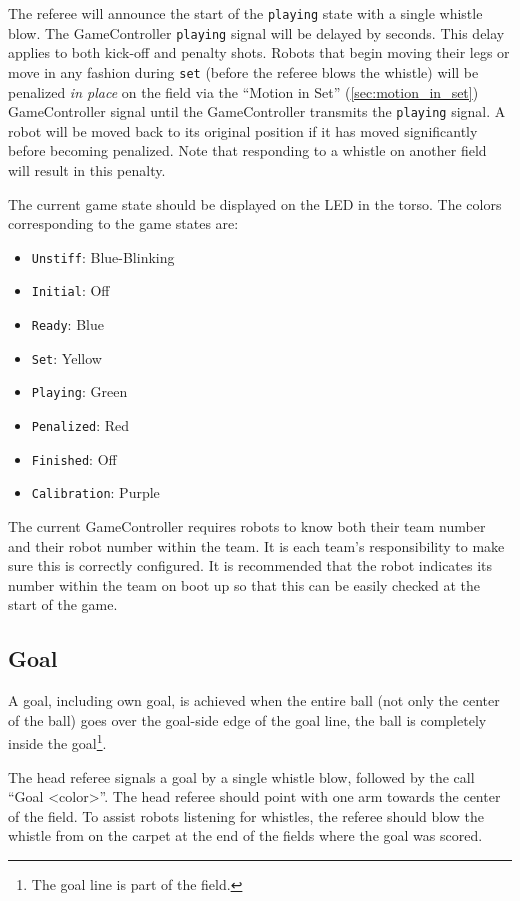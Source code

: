 The referee will announce the start of the \texttt{playing} state with a single whistle blow.
The GameController \texttt{playing} signal will be delayed by \PlayingDelayTime seconds.
This delay applies to both kick-off and penalty shots.
Robots that begin moving their legs or move in any fashion during \texttt{set} (\ie before the referee blows the whistle) will be penalized \textit{in place} on the field via the ``Motion in Set'' (\cf \cref{sec:motion_in_set}) GameController signal until the GameController transmits the \texttt{playing} signal. A robot will be moved back to its original position if it has moved significantly before becoming penalized.
Note that responding to a whistle on another field will result in this penalty.

The current game state should be displayed on the LED in the torso. The colors corresponding to the game states are:

\begin{itemize}
  \item \texttt{Unstiff}: Blue-Blinking
  \item \texttt{Initial}: Off
  \item \texttt{Ready}: Blue
  \item \texttt{Set}: Yellow
  \item \texttt{Playing}: Green
  \item \texttt{Penalized}: Red
  \item \texttt{Finished}: Off
  \item \texttt{Calibration}: Purple
\end{itemize}

The current GameController requires robots to know both their team number and their robot number within the team. It is each team's responsibility to make sure this is correctly configured. It is recommended that the robot indicates its number within the team on boot up so that this can be easily checked at the start of the game.

\subsection{Goal}
\label{sec:goal}
A goal, including own goal, is achieved when the entire ball (not only the center of the ball) goes over the goal-side edge of the goal line, \ie the ball is completely inside the goal\footnote{The goal line is part of the field.}.

The head referee signals a goal by a single whistle blow, followed by the call ``Goal \textless color\textgreater''.
The head referee should point with one arm towards the center of the field.
To assist robots listening for whistles, the referee should blow the whistle from on the carpet at the end of the fields where the goal was scored.

